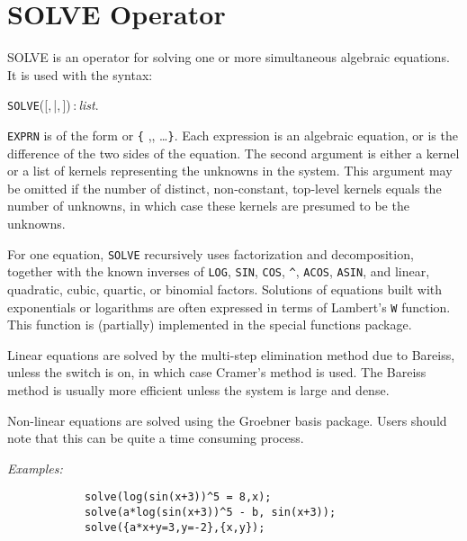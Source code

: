 \section{SOLVE Operator}
\hypertarget{operator:SOLVE}{}
SOLVE is an operator for solving one or more simultaneous algebraic
equations. It is used with the syntax:
\begin{syntax}
  \texttt{SOLVE}([,\,|,\,])\,:\,\textit{list}.
\end{syntax}
\texttt{EXPRN} is of the form  or
\texttt{\{} ,, \dots \texttt{\}}.  
Each expression is an
algebraic equation, or is the difference of the two sides of the equation.
The second argument is either a kernel or a list of kernels representing
the unknowns in the system.  This argument may be omitted if the number of
distinct, non-constant, top-level kernels equals the number of unknowns,
in which case these kernels are presumed to be the unknowns.

For one equation, \texttt{SOLVE} recursively uses
factorization and decomposition, together with the known inverses of
\texttt{LOG}, \texttt{SIN}, \texttt{COS}, \texttt{\textasciicircum}, 
\texttt{ACOS}, \texttt{ASIN}, and
linear, quadratic, cubic, quartic, or binomial factors. Solutions
of equations built with exponentials or logarithms are often
expressed in terms of Lambert's \texttt{W} function.
This function is (partially) implemented in the special functions package.

\hypertarget{switch:CRAMER}{}
Linear equations are solved by the multi-step elimination method due to
Bareiss, unless the switch  is on, in which
case Cramer's method is used.  The Bareiss method is usually more
efficient unless the system is large and dense.

Non-linear equations are solved using the Groebner basis 
package. 
Users should note that this 
can be quite a time consuming process.

\textit{Examples:}
\begin{verbatim}
            solve(log(sin(x+3))^5 = 8,x);
            solve(a*log(sin(x+3))^5 - b, sin(x+3));
            solve({a*x+y=3,y=-2},{x,y});
\end{verbatim}

